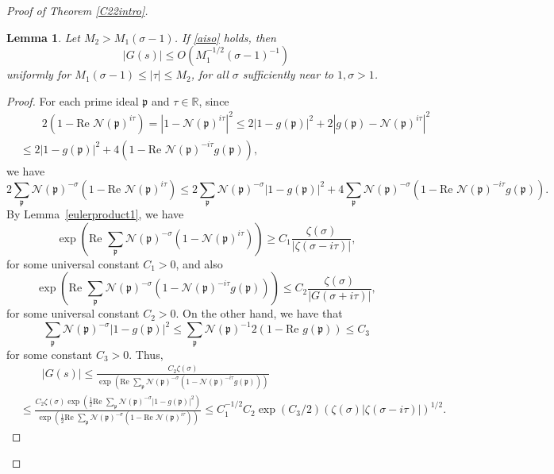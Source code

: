 \documentclass[11pt]{amsart}
\newtheorem{lemma}{Lemma}[section]
\theoremstyle{definition}
\newcommand{\NN}{{\mathcal N}}
\newcommand{\R}{{\mathbb R}}
\newcommand{\mf}{\mathfrak}
\begin{document}
\begin{proof}[Proof of Theorem \ref{C22intro}]
   \begin{lemma}\label{lem69elliott}
    Let $M_{2}>M_{1}(\sigma-1)$. If \eqref{aiso} holds, then
   \[
   |G(s)| \leq O(M_{1}^{-1/2}(\sigma-1)^{-1})
   \]
   uniformly for $M_{1}(\sigma-1) \leq |\tau| \leq M_{2}$, for all $\sigma$ sufficiently near to $1, \sigma>1$.  
   \end{lemma}
   \begin{proof}
   For each prime ideal $\mf p$ and $\tau \in \R$, since %
   \begin{equation*}
       \begin{split}
         &\qquad  2(1-\text{Re } \NN(\mf p)^{i\tau})=|1-\NN(\mf p)^{i\tau}|^2 \leq 2|1-g(\mf p)|^2+2|g(\mf p)-\NN(\mf p)^{i\tau}|^2 
         \\&\leq 2|1-g(\mf p)|^2+4(1-\text{Re }\NN(\mf p)^{-i\tau}g(\mf p)),
       \end{split}
   \end{equation*}
  we have
   \[
   2\sum_{\mf p} \NN(\mf p)^{-\sigma}(1-\text{Re } \NN(\mf p)^{i\tau}) \leq 2\sum_{\mf p} \NN(\mf p)^{-\sigma}|1-g(\mf p)|^2+4\sum_{\mf p} \NN(\mf p)^{-\sigma} (1-\text{Re }\NN(\mf p)^{-i\tau}g(\mf p)).
   \]
   By Lemma~\ref{eulerproduct1}, we have
   \[
   \exp\left( \text{Re } \sum_{\mf p} \NN(\mf p)^{-\sigma} (1-\NN(\mf p)^{i\tau})\right) \geq C_1 \frac{\zeta(\sigma)}{|\zeta(\sigma-i\tau)|},
   \]
   for some universal constant $C_1>0$, and also
   \[
    \exp\left( \text{Re } \sum_{\mf p} \NN(\mf p)^{-\sigma} (1-\NN(\mf p)^{-i\tau}g(\mf p))\right) \leq C_2 \frac{\zeta(\sigma)}{|G(\sigma+i\tau)|},
   \]
    for some universal constant $C_2>0$. On the other hand, we have that
   \[
   \sum_{\mf p} \NN(\mf p)^{-\sigma} |1-g(\mf p)|^2 \leq \sum_{\mf p} \NN(\mf p)^{-1} 2(1-\text{Re }g(\mf p)) \leq C_3
   \]
   for some constant $C_3>0$. Thus,
 \begin{equation*}
       \begin{split}
         &\qquad |G(s)| \leq \frac{C_{2}\zeta(\sigma)}{\exp\left(\text{Re } \sum_{\mf p} \NN(\mf p)^{-\sigma}(1-\NN(\mf p)^{-i\tau}g(\mf p))\right)}
         \\&\leq \frac{C_{2}\zeta(\sigma)\exp\left( \frac{1}{2} \text{Re } \sum_{\mf p}\NN(\mf p)^{-\sigma}|1-g(\mf p)|^2\right)}{\exp\left(\frac{1}{2}\text{Re } \sum_{\mf p}\NN(\mf p)^{-\sigma} (1-\text{Re } \NN(\mf p)^{i\tau})\right)} \leq  C_{1}^{-1/2}C_{2}\exp(C_{3}/2)(\zeta(\sigma)|\zeta(\sigma-i\tau)|)^{1/2}.
       \end{split}
   \end{equation*}



\end{proof}
\end{proof}
\end{document}
